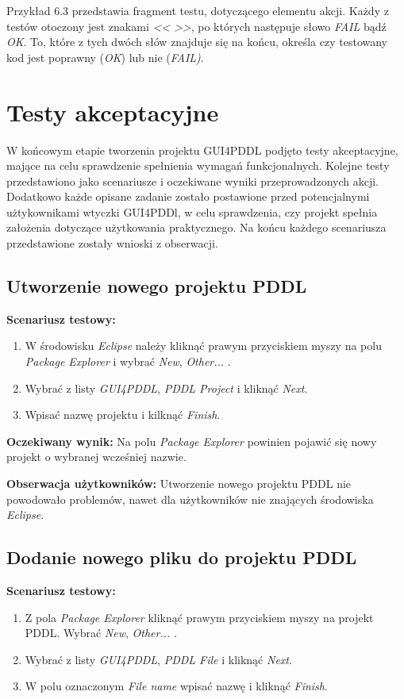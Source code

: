 Przykład 6.3 przedstawia fragment testu, dotyczącego elementu akcji. Każdy z testów otoczony jest znakami \textit{<<} \textit{>>}, po których następuje słowo \textit{FAIL} bądź \textit{OK}. To, które z tych dwóch słów znajduje się na końcu, określa czy testowany kod jest poprawny (\textit{OK}) lub nie (\textit{FAIL)}.




\section{Testy akceptacyjne}
W końcowym etapie tworzenia projektu GUI4PDDL podjęto testy akceptacyjne, mające na celu sprawdzenie spełnienia wymagań funkcjonalnych. Kolejne testy przedstawiono jako scenariusze i oczekiwane wyniki przeprowadzonych akcji.
Dodatkowo każde opisane zadanie zostało postawione przed potencjalnymi użtykownikami wtyczki GUI4PDDl, w celu sprawdzenia, czy projekt spełnia założenia dotyczące użytkowania praktycznego. Na końcu każdego scenariusza przedstawione zostały wnioski z obserwacji. 
\subsection{Utworzenie nowego projektu PDDL}
\textbf{Scenariusz testowy:}
  \begin{enumerate}
  
\item W środowisku \textit{Eclipse} należy kliknąć prawym przyciskiem myszy na polu \textit{Package Explorer} i wybrać \textit{New}, \textit{Other...} .
\item Wybrać z listy \textit{GUI4PDDL}, \textit{PDDL Project} i kliknąć \textit{Next}.
\item Wpisać nazwę projektu i kilknąć \textit{Finish}.
\end{enumerate}

\textbf{Oczekiwany wynik:} Na polu \textit{Package Explorer} powinien pojawić się nowy projekt o wybranej wcześniej nazwie.

\textbf{Obserwacja użytkowników:} Utworzenie nowego projektu PDDL nie powodowało problemów, nawet dla użytkowników nie znających środowiska \textit{Eclipse}.
\subsection{Dodanie nowego pliku do projektu PDDL}
\textbf{Scenariusz testowy:}
  \begin{enumerate}
  
\item Z pola \textit{Package Explorer} kliknąć prawym przyciskiem myszy na projekt PDDL. Wybrać \textit{New}, \textit{Other...} .
\item Wybrać z listy \textit{GUI4PDDL}, \textit{PDDL File} i kliknąć \textit{Next}.
\item W polu oznaczonym \textit{File name} wpisać nazwę i kliknąć \textit{Finish}.
\end{enumerate}

